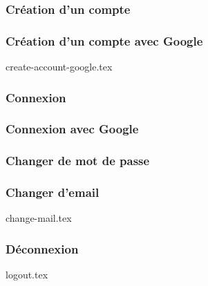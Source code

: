 \subsubsection{Création d'un compte}
\subsubsection{Création d'un compte avec Google}
{create-account-google.tex}
\subsubsection{Connexion}
\subsubsection{Connexion avec Google}
\subsubsection{Changer de mot de passe}

\subsubsection{Changer d'email}
{change-mail.tex}

\subsubsection{Déconnexion}
{logout.tex}